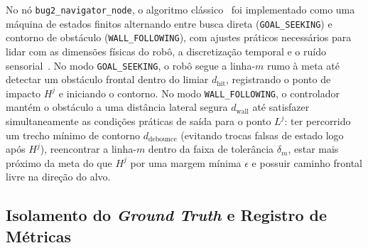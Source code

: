 No nó \texttt{bug2\_navigator\_node}, o algoritmo clássico~\cite{lumelsky1987} foi implementado como uma máquina de estados finitos alternando entre busca direta (\texttt{GOAL\_SEEKING}) e contorno de obstáculo (\texttt{WALL\_FOLLOWING}), com ajustes práticos necessários para lidar com as dimensões físicas do robô, a discretização temporal e o ruído sensorial~\cite{siegwart2004}. No modo \texttt{GOAL\_SEEKING}, o robô segue a linha-$m$ rumo à meta até detectar um obstáculo frontal dentro do limiar $d_{\text{hit}}$, registrando o ponto de impacto $H^j$ e iniciando o contorno. No modo \texttt{WALL\_FOLLOWING}, o controlador mantém o obstáculo a uma distância lateral segura $d_{\text{wall}}$ até satisfazer simultaneamente as condições práticas de saída para o ponto $L^j$: ter percorrido um trecho mínimo de contorno $d_{\text{debounce}}$ (evitando trocas falsas de estado logo após $H^j$), reencontrar a linha-$m$ dentro da faixa de tolerância $\delta_m$, estar mais próximo da meta do que $H^j$ por uma margem mínima $\epsilon$ e possuir caminho frontal livre na direção do alvo.

\subsection{Isolamento do \textit{Ground Truth} e Registro de Métricas}
